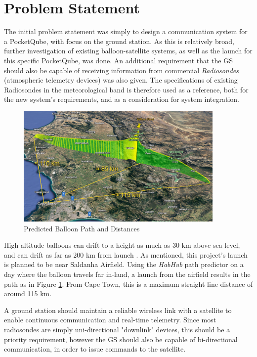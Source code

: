 \graphicspath{{./figures/}}

\section{Problem Statement}

The initial problem statement was simply to design a communication system for a PocketQube, with focus on the ground station. As this is relatively broad, further investigation of existing balloon-satellite systems, as well as the launch for this specific PocketQube, was done. An additional requirement that the GS should also be capable of receiving information from commercial \textit{Radiosondes} (atmospheric telemetry devices) was also given. The specifications of existing Radiosondes in the meteorological band is therefore used as a reference, both for the new system's requirements, and as a consideration for system integration.

\begin{figure}[!htb]
  \centering
  \includegraphics[width=0.9\textwidth]{balloon_path_3d}
  \caption{Predicted Balloon Path and Distances}
  \label{fig:balloon_path}
\end{figure}

High-altitude balloons can drift to a height as much as 30 km above sea level, and can drift as far as 200 km from launch \cite{site-weatherWeatherBalloons}. As mentioned, this project's launch is planned to be near Saldanha Airfield. Using the \textit{HabHub} path predictor \cite{site-habHub} on a day where the balloon travels far in-land, a launch from the airfield results in the path as in Figure \ref{fig:balloon_path}. From Cape Town, this is a maximum straight line distance of around 115 km. 

A ground station should maintain a reliable wireless link with a satellite to enable continuous communication and real-time telemetry. Since most radiosondes are simply uni-directional "downlink" devices, this should be a priority requirement, however the GS should also be capable of bi-directional communication, in order to issue commands to the satellite.